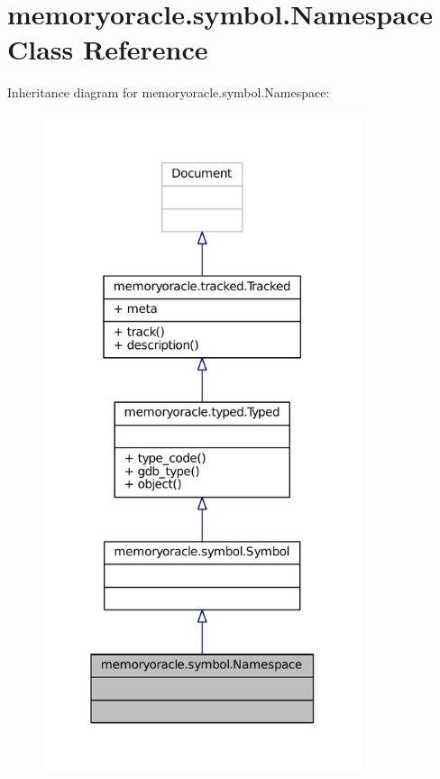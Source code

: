 \hypertarget{classmemoryoracle_1_1symbol_1_1Namespace}{}\section{memoryoracle.\+symbol.\+Namespace Class Reference}
\label{classmemoryoracle_1_1symbol_1_1Namespace}


Inheritance diagram for memoryoracle.\+symbol.\+Namespace\+:
\nopagebreak
\begin{figure}[H]
\begin{center}
\leavevmode
\includegraphics[width=265pt]{classmemoryoracle_1_1symbol_1_1Namespace__inherit__graph}
\end{center}
\end{figure}


